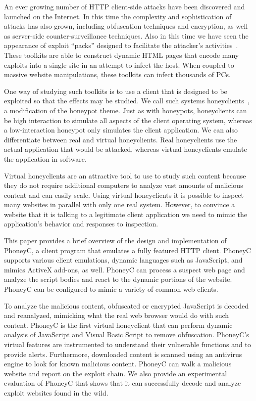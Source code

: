 \documentclass[10pt,twocolumn]{article}
\begin{document}
An ever growing number of HTTP client-side attacks have been discovered and launched on the Internet. In this time the complexity and sophistication of attacks has also grown, including obfuscation techniques and encryption, as well as server-side counter-surveillance techniques. Also in this time we have seen the appearance of exploit ``packs'' designed to facilitate the attacker's activities~\cite{provos:ayi}. These toolkits are able to construct dynamic HTML pages that encode many exploits into a single site in an attempt to infect the host. When coupled to massive website manipulations, these toolkits can infect thousands of PCs. 

One way of studying such toolkits is to use a client that is designed to be exploited so that the effects may be studied. We call such systems honeyclients~\cite{wang2005uhd}, a modification of the honeypot theme. Just as with honeypots, honeyclients can be high interaction to simulate all aspects of the client operating system, whereas a low-interaction honeypot only simulates the client application. We can also differentiate between real and virtual honeyclients. Real honeyclients use the actual application that would be attacked, whereas virtual honeyclients emulate the application in software.

Virtual honeyclients are an attractive tool to use to study such content because they do not require additional computers to analyze vast amounts of malicious content and can easily scale. Using virtual honeyclients it is possible to inspect many websites in parallel with only one real system. However, to convince a website that it is talking to a legitimate client application we need to mimic the application's behavior and responses to inspection. 

This paper provides a brief overview of the design and implementation of PhoneyC, a client program that emulates a fully featured HTTP client. PhoneyC supports various client emulations, dynamic languages such as JavaScript, and mimics ActiveX add-ons, as well. PhoneyC can process a suspect web page and analyze the script bodies and react to the dynamic portions of the website. PhoneyC can be configured to mimic a variety of common web clients. 

To analyze the malicious content, obfuscated or encrypted JavaScript is decoded and reanalyzed, mimicking what the real web browser would do with such content. PhoneyC is the first virtual honeyclient that can perform dynamic analysis of JavaScript and Visual Basic Script to remove obfuscation. PhoneyC's virtual features are instrumented to understand their vulnerable functions and to provide alerts. Furthermore, downloaded content is scanned using an antivirus engine to look for known malicious content. PhoneyC can walk a malicious website and report on the exploit chain. We also provide an experimental evaluation of PhoneyC that shows that it can successfully decode and analyze exploit websites found in the wild. 
\end{document}
